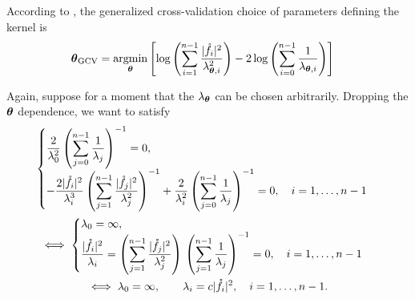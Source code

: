 \documentclass{amsart}
\begin{document}
According to \cite{RatHic19a}, the generalized cross-validation choice of parameters defining the kernel is
\begin{align*}
    \boldsymbol{\theta}_{\text{GCV}} 
    &= \operatorname*{argmin}_{\boldsymbol{\theta}} \left [\log\left( \sum_{i=1}^{n-1} \frac{\lvert\mathring{f}_i\rvert^2}{\lambda_{\boldsymbol{\theta},i}^2} \right)
    - 2 \log \left(\sum_{i=0}^{n-1} \frac{1}{\lambda_{\boldsymbol{\theta},i}} \right) \right ]
\end{align*}

Again, suppose for a moment that the $\lambda_{\boldsymbol{\theta}}$ can be chosen arbitrarily.  Dropping the $\boldsymbol{\theta}$ dependence, we want to satisfy
\begin{gather*}
    \begin{cases}
    \displaystyle \frac {2}{\lambda_0^2} \left( \sum_{j=0}^{n-1} \frac{1}{\lambda_{j}} \right)^{-1}  = 0, \\ 
    \displaystyle - \frac{2\lvert\mathring{f}_i\rvert^2}{\lambda_{i}^3} \left( \sum_{j=1}^{n-1} \frac{\lvert\mathring{f}_j\rvert^2}{\lambda_{j}^2} \right)^{-1} +  \frac{2}{\lambda_i^2} \left( \sum_{j=0}^{n-1} \frac{1}{\lambda_{j}} \right)^{-1} = 0, \quad i = 1, \ldots, n-1
    \end{cases}
    \\
    \iff
    \begin{cases}
    \lambda_0 = \infty,  \\ 
    \displaystyle \frac{\lvert\mathring{f}_i\rvert^2}{\lambda_{i}} =  \left( \sum_{j=1}^{n-1} \frac{\lvert\mathring{f}_j\rvert^2}{\lambda_{j}^2} \right) \, \left( \sum_{j=1}^{n-1} \frac{1}{\lambda_{j}} \right)^{-1} = 0, \quad i = 1, \ldots, n-1
    \end{cases}
    \\
    \iff
     \lambda_0 = \infty, \qquad \lambda_i = c \lvert\mathring{f}_i\rvert^2, \quad i = 1, \ldots, n-1.
\end{gather*}



\end{document}
